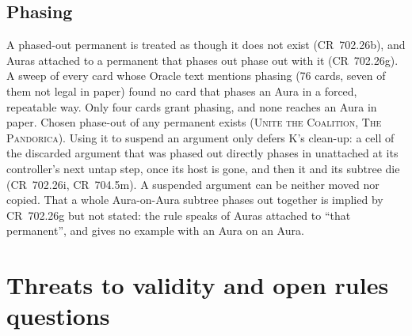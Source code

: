 \documentclass[11pt]{article}
\theoremstyle{definition}
\newcommand{\card}[1]{{\mdseries\scshape #1}}
\newcommand{\CR}[1]{CR~#1}
\begin{document}
\subsection{Phasing}

A phased-out permanent is treated as though it does not exist (\CR{702.26b}), and Auras
attached to a permanent that phases out phase out with it (\CR{702.26g}). A sweep of every
card whose Oracle text mentions phasing (76 cards, seven of them not legal in paper) found
no card that phases an Aura in a forced, repeatable way. Only four cards grant phasing,
and none reaches an Aura in paper. Chosen phase-out of any permanent exists (\card{Unite the
Coalition}, \card{The Pandorica}). Using it to suspend an argument only defers K's
clean-up: a cell of the discarded argument that was phased out directly phases in
unattached at its controller's next untap step, once its host is gone, and then it and its
subtree die (\CR{702.26i}, \CR{704.5m}). A suspended argument can be neither moved nor
copied. That a whole Aura-on-Aura subtree phases out together is implied by \CR{702.26g}
but not stated: the rule speaks of Auras attached to ``that permanent'', and gives no
example with an Aura on an Aura.

\section{Threats to validity and open rules questions}\label{sec:threats}
\end{document}
